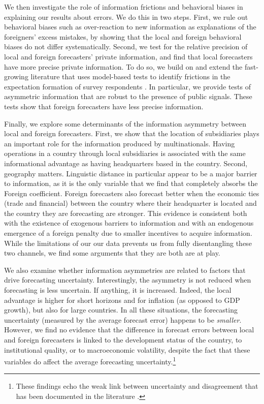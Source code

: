 We then investigate the role of information frictions and behavioral biases in explaining our results about errors. We do this in two steps. First, we rule out behavioral biases such as over-reaction to new information as explanations of the foreigners' excess mistakes, by showing that the local and foreign behavioral biases do not differ systematically. Second, we test for the relative precision of local and foreign forecasters' private information, and find that local forecasters have more precise private information. To do so, we build on and extend the fast-growing literature that uses model-based tests to identify frictions in the expectation formation of survey respondents \citep{CoibionGorodnichenko2015,Bordaloetal2020,BroerKohlhas2019,Angeletosetal2020,Goldstein2021}. In particular, we provide tests of asymmetric information that are robust to the presence of public signals. These tests show that foreign forecasters have less precise information.

Finally, we explore some determinants of the information asymmetry between local and foreign forecasters. First, we show that the location of subsidiaries plays an important role for the information produced by multinationals. Having operations in a country through local subsidiaries is associated with the same informational advantage as having headquarters based in the country. Second, geography matters. Linguistic distance in particular appear to be a major barrier to information, as it is the only variable that we find that completely absorbs the Foreign coefficient. Foreign forecasters also forecast better when the economic ties (trade and financial) between the country where their headquarter is located and the country they are forecasting are stronger. This evidence is consistent both with the existence of exogenous barriers to information and with an endogenous emergence of a foreign penalty due to smaller incentives to acquire information. While the limitations of our our data prevents us from fully disentangling these two channels, we find some arguments that they are both are at play.

We also examine whether information asymmetries are related to factors that drive forecasting uncertainty. Interestingly, the asymmetry is not reduced when forecasting is less uncertain. If anything, it is increased. Indeed, the local advantage is higher for short horizons and for inflation (as opposed to GDP growth), but also for large countries. In all these situations, the forecasting uncertainty (measured by the average forecast error) happens to be \emph{smaller}. However, we find no evidence that the difference in forecast errors between local and foreign forecasters is linked to the development status of the country, to institutional quality, or to macroeconomic volatility, despite the fact that these variables do affect the average forecasting uncertainty.\footnote{These findings echo the weak link between uncertainty and disagreement that has been documented in the literature \citep{LahiriSheng2010,RichTracy2010}.}%

